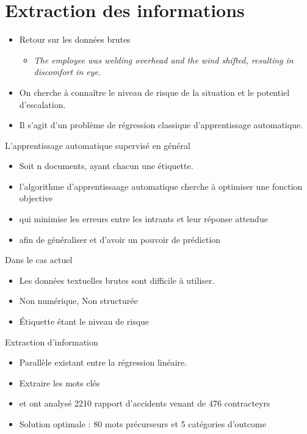\section{Extraction des informations}

	\begin{frame}
		\begin{itemize}
		\item Retour sur les données brutes
			\begin{itemize}
				\item \textit{The employee was welding overhead and the wind shifted, resulting in discomfort in eye.}\\
			\end{itemize}
		\item On cherche à connaître le niveau de risque de la situation et le potentiel d'escalation.
		\item Il s'agit d'un problème de régression classique d'apprentissage automatique.
		\end{itemize}			
	\end{frame}


\begin{frame}
	L'apprentissage automatique supervisé en général
	\begin{itemize}
		\item Soit n documents, ayant chacun une étiquette.
		\item l'algorithme d'apprentissaage automatique cherche à optimiser une fonction objective
		\item qui minimise les erreurs entre les intrants et leur réponse attendue
		\item afin de généraliser et d'avoir un pouvoir de prédiction
	\end{itemize}			
	
	\bigskip
	
	Dans le cas actuel
	\begin{itemize}
		\item Les données textuelles brutes sont difficile à utiliser.
		\item Non numérique, Non structurée 
		\item Étiquette étant le niveau de risque 	
	\end{itemize}			
\end{frame}


\begin{frame}
	Extraction d'information
	\begin{itemize}
		\item Parallèle existant entre la régression linéaire.
		\item Extraire les mots clés
		\item \cite{prades} et \cite{desvignes} ont analysé 2210 rapport d'accidents venant de 476 contracteyrs
		\item Solution optimale : 80 mots précurseurs et 5 catégories d'outcome
	\end{itemize}			
\end{frame}



